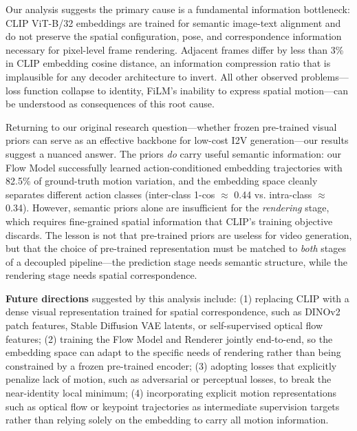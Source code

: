 \documentclass[10pt,twocolumn,letterpaper]{article}
\begin{document}
Our analysis suggests the primary cause is a fundamental information
bottleneck: CLIP ViT-B/32 embeddings are trained for semantic image-text
alignment and do not preserve the spatial configuration, pose, and
correspondence information necessary for pixel-level frame rendering.
Adjacent frames differ by less than 3\% in CLIP embedding cosine distance,
an information compression ratio that is implausible for any decoder
architecture to invert. All other observed problems---loss function
collapse to identity, FiLM's inability to express spatial motion---can
be understood as consequences of this root cause.

Returning to our original research question---whether frozen pre-trained
visual priors can serve as an effective backbone for low-cost I2V
generation---our results suggest a nuanced answer. The priors \emph{do}
carry useful semantic information: our Flow Model successfully learned
action-conditioned embedding trajectories with 82.5\% of ground-truth
motion variation, and the embedding space cleanly separates different
action classes (inter-class 1-cos $\approx$ 0.44 vs. intra-class $\approx$
0.34). However, semantic priors alone are insufficient for the
\emph{rendering} stage, which requires fine-grained spatial information
that CLIP's training objective discards. The lesson is not that pre-trained
priors are useless for video generation, but that the choice of
pre-trained representation must be matched to \emph{both} stages of a
decoupled pipeline---the prediction stage needs semantic structure, while
the rendering stage needs spatial correspondence.

\textbf{Future directions} suggested by this analysis include: (1)
replacing CLIP with a dense visual representation trained for spatial
correspondence, such as DINOv2 patch features, Stable Diffusion VAE
latents, or self-supervised optical flow features; (2) training the Flow
Model and Renderer jointly end-to-end, so the embedding space can adapt to
the specific needs of rendering rather than being constrained by a frozen
pre-trained encoder; (3) adopting losses that explicitly penalize lack of
motion, such as adversarial or perceptual losses, to break the near-identity
local minimum; (4) incorporating explicit motion representations such as
optical flow or keypoint trajectories as intermediate supervision targets
rather than relying solely on the embedding to carry all motion information.
\end{document}
